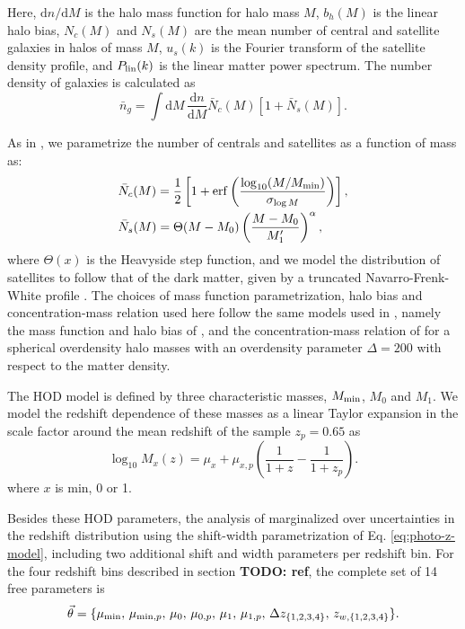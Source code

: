 \documentclass[a4paper,11pt]{article}
\newcommand{\todo}[1]{{\bf TODO: #1}}
\begin{document}
    Here, $\mathrm{d}n/\mathrm{d}M$ is the halo mass function for halo mass $M$, $b_h(M)$ is the linear halo bias, $N_c(M)$ and $N_s(M)$ are the mean number of central and satellite galaxies in halos of mass $M$, $u_s(k)$ is the Fourier transform of the satellite density profile, and $P_{\rm lin}(k)$ is the linear matter power spectrum. The number density of galaxies is calculated as 
    \begin{equation}
      \bar{n}_g=\int \mathrm{d}M\,\frac{\mathrm{d}n}{\mathrm{d}M}\bar{N}_c(M)\left[1+\bar{N}_s(M)\right].
      \label{eq:ng_hod}
    \end{equation}    
    
    As in \cite{1912.08209}, we parametrize the number of centrals and satellites as a function of mass as:
    \begin{align}
      &\bar{N}_c(M)=\frac{1}{2}\left[1+{\rm erf}\left(\frac{\log_{10}(M/M_{\rm min})}{\sigma_{\log M}}\right)\right],\\
      &\bar{N}_s(M)=\Theta(M-M_0)\left(\frac{M-M_0}{M_1'}\right)^\alpha,
    \end{align}
    where $\Theta(x)$ is the Heavyside step function, and we model the distribution of satellites to follow that of the dark matter, given by a truncated Navarro-Frenk-White profile \cite{Navarro:1996}. The choices of mass function parametrization, halo bias and concentration-mass relation used here follow the same models used in \cite{1912.08209}, namely the mass function and halo bias of \cite{Tinker:2010}, and the concentration-mass relation of \cite{Duffy:2008} for a spherical overdensity halo masses with an overdensity parameter $\Delta=200$ with respect to the matter density.
 
    The HOD model is defined by three characteristic masses, $M_{\rm min}$, $M_0$ and $M_1$. We model the redshift dependence of these masses as a linear Taylor expansion in the scale factor around the mean redshift of the sample $z_p=0.65$ as
    \begin{equation}
      \log_{10}{M_x(z)} = \mu_x + \mu_{x, p} \left(\frac{1}{1+z} - \frac{1}{1+z_{p}}\right).
    \end{equation}
    where $x$ is $\mathrm{min}$, 0 or 1.
    
    Besides these HOD parameters, the analysis of \cite{1912.08209} marginalized over uncertainties in the redshift distribution using the shift-width parametrization of Eq. \ref{eq:photo-z-model}, including two additional shift and width parameters per redshift bin. For the four redshift bins described in section \todo{ref}, the complete set of 14 free parameters is
    \begin{equation}
      \vec{\theta}=\{\mu_{\rm min},\,\mu_{{\rm min},p},\,\mu_0,\,\mu_{0,p},\,\mu_1,\,\mu_{1,p},\,\Delta z_{\{1,2,3,4\}},\,z_{w,\{1,2,3,4\}}\}.
    \end{equation}
\end{document}
